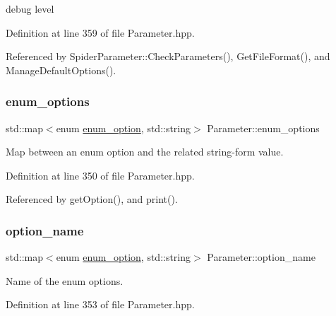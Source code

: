 debug level 



Definition at line 359 of file Parameter.\+hpp.



Referenced by Spider\+Parameter\+::\+Check\+Parameters(), Get\+File\+Format(), and Manage\+Default\+Options().

\mbox{\label{classParameter_a71adfef6cc51f69c6fb852a5f017fe0f}} 
\subsubsection{\texorpdfstring{enum\+\_\+options}{enum\_options}}
{\footnotesize\ttfamily std\+::map$<$enum \hyperlink{Parameter_8hpp_a6d9441db52e537f5588658b218875976}{enum\+\_\+option}, std\+::string$>$ Parameter\+::enum\+\_\+options\hspace{0.3cm}{\ttfamily [protected]}}



Map between an enum option and the related string-\/form value. 



Definition at line 350 of file Parameter.\+hpp.



Referenced by get\+Option(), and print().

\mbox{\label{classParameter_a39687926ae0985dc907fe5079f04be10}} 
\subsubsection{\texorpdfstring{option\+\_\+name}{option\_name}}
{\footnotesize\ttfamily std\+::map$<$enum \hyperlink{Parameter_8hpp_a6d9441db52e537f5588658b218875976}{enum\+\_\+option}, std\+::string$>$ Parameter\+::option\+\_\+name\hspace{0.3cm}{\ttfamily [protected]}}



Name of the enum options. 



Definition at line 353 of file Parameter.\+hpp.



